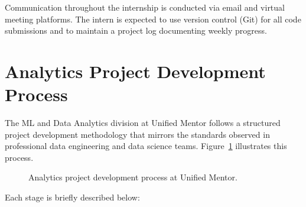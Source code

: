 \documentclass[12pt, a4paper]{report}
\begin{document}
Communication throughout the internship is conducted via email and virtual
meeting platforms. The intern is expected to use version control (Git) for
all code submissions and to maintain a project log documenting weekly
progress.

\section{Analytics Project Development Process}

The ML and Data Analytics division at Unified Mentor follows a structured
project development methodology that mirrors the standards observed in
professional data engineering and data science teams. Figure~\ref{fig:devprocess}
illustrates this process.

\begin{figure}[H]
  \centering
  \caption{Analytics project development process at Unified Mentor.}
  \label{fig:devprocess}
\end{figure}

Each stage is briefly described below:
\end{document}
